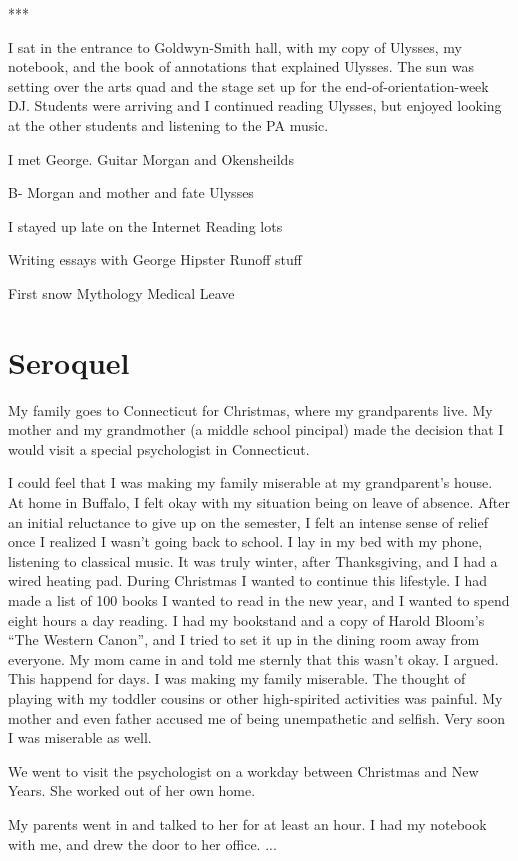 \documentclass[12pt]{article}
\begin{document}
***

I sat in the entrance to Goldwyn-Smith hall, with my copy of Ulysses, my
notebook, and the book of annotations that explained Ulysses.  The sun was
setting over the arts quad and the stage set up for the end-of-orientation-week
DJ.  Students were arriving and I continued reading Ulysses, but enjoyed
looking at the other students and listening to the PA music.

I met George.  Guitar
Morgan and Okensheilds 

B-
Morgan and mother and fate
Ulysses

I stayed up late on the Internet
Reading lots

Writing essays with George
Hipster Runoff stuff

First snow
Mythology
Medical Leave

\section{Seroquel}
My family goes to Connecticut for Christmas, where my grandparents live.  My
mother and my grandmother (a middle school pincipal) made the decision that I
would visit a special psychologist in Connecticut.

I could feel that I was making my family miserable at my grandparent's house.
At home in Buffalo, I felt okay with my situation being on leave of absence.
After an initial reluctance to give up on the semester, I felt an intense sense
of relief once I realized I wasn't going back to school.  I lay in my bed with my
phone, listening to classical music.  It was truly winter, after Thanksgiving,
and I had a wired heating pad.  During Christmas I wanted to continue this
lifestyle.  I had made a list of 100 books I wanted to read in the new year,
and I wanted to spend eight hours a day reading.  I had my bookstand and a copy
of Harold Bloom's ``The Western Canon'', and I tried to set it up in the dining
room away from everyone.  My mom came in and told me sternly that this wasn't
okay.  I argued.  This happend for days.  I was making my family miserable.  The
thought of playing with my toddler cousins or other high-spirited activities was
painful.  My mother and even father accused me of being unempathetic and
selfish.  Very soon I was miserable as well.

We went to visit the psychologist on a workday between Christmas and New
Years.  She worked out of her own home. 

My parents went in and talked to her for at least an hour.  I had my notebook
with me, and drew the door to her office.   ...
\end{document}

